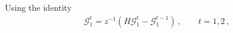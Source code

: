 \documentclass[12pt]{article}
\numberwithin{equation}{section}
\newtheorem{prop}{Proposition}
\theoremstyle{remark}
\newcommand{\1}{{\rm 1}\kern-0.24em{\rm I}}
\newcommand{\E}{{\rm I}\kern-0.18em{\rm E}}
\begin{document}
\begin{appendices}
%
 
 


 Using the identity 
 \begin{align*}
 \mathcal{G}_1^t = z^{-1} (H\mathcal{G}_1^t - \mathcal{G}_1^{t-1})\,, \qquad t=1,2\,,
 \end{align*}


\end{appendices}
\end{document}
